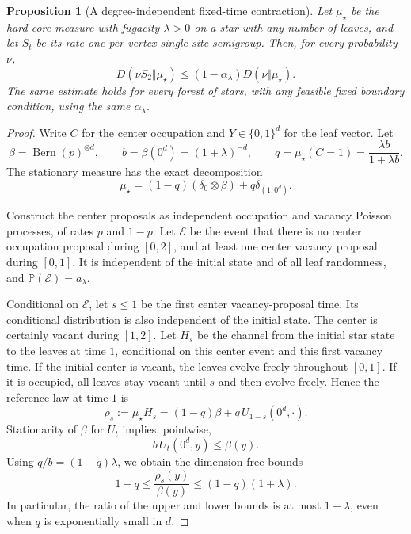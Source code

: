 \documentclass[11pt,reqno]{amsart}
\newtheorem{proposition}[theorem]{Proposition}
\theoremstyle{remark}
\newcommand{\Prob}{\mathbb P}
\numberwithin{equation}{section}
\begin{document}
\begin{proposition}[A degree-independent fixed-time contraction]\label{prop:star}
Let $\mu_\star$ be the hard-core measure with fugacity $\lambda>0$ on a star with any number of leaves, and let $S_t$ be its rate-one-per-vertex single-site semigroup. Then, for every probability $\nu$,
\begin{equation}\label{eq:star-contraction}
 D(\nu S_2\Vert\mu_\star)
 \le(1-\alpha_\lambda)D(\nu\Vert\mu_\star).
\end{equation}
The same estimate holds for every forest of stars, with any feasible fixed boundary condition, using the same $\alpha_\lambda$.
\end{proposition}

\begin{proof}
Write $C$ for the center occupation and $Y\in\{0,1\}^d$ for the leaf vector. Let
\[
 \beta=\operatorname{Bern}(p)^{\otimes d},\qquad
 b=\beta(0^d)=(1+\lambda)^{-d},\qquad
 q=\mu_\star(C=1)=\frac{\lambda b}{1+\lambda b}.
\]
The stationary measure has the exact decomposition
\begin{equation}\label{eq:star-measure}
 \mu_\star=(1-q)(\delta_0\otimes\beta)
             +q\delta_{(1,0^d)}.
\end{equation}

Construct the center proposals as independent occupation and vacancy Poisson processes, of rates $p$ and $1-p$. Let $\mathcal E$ be the event that there is no center occupation proposal during $[0,2]$, and at least one center vacancy proposal during $[0,1]$. It is independent of the initial state and of all leaf randomness, and $\Prob(\mathcal E)=a_\lambda$.

Conditional on $\mathcal E$, let $s\le1$ be the first center vacancy-proposal time. Its conditional distribution is also independent of the initial state. The center is certainly vacant during $[1,2]$. Let $H_s$ be the channel from the initial star state to the leaves at time $1$, conditional on this center event and this first vacancy time. If the initial center is vacant, the leaves evolve freely throughout $[0,1]$. If it is occupied, all leaves stay vacant until $s$ and then evolve freely. Hence the reference law at time $1$ is
\[
 \rho_s:=\mu_\star H_s=(1-q)\beta+q\,U_{1-s}(0^d,\cdot).
\]
Stationarity of $\beta$ for $U_t$ implies, pointwise,
\[
 b\,U_t(0^d,y)\le\beta(y).
\]
Using $q/b=(1-q)\lambda$, we obtain the dimension-free bounds
\begin{equation}\label{eq:reference-bound}
 1-q\le\frac{\rho_s(y)}{\beta(y)}
 \le(1-q)(1+\lambda).
\end{equation}
In particular, the ratio of the upper and lower bounds is at most $1+\lambda$, even when $q$ is exponentially small in $d$.


\end{proof}
\end{document}
